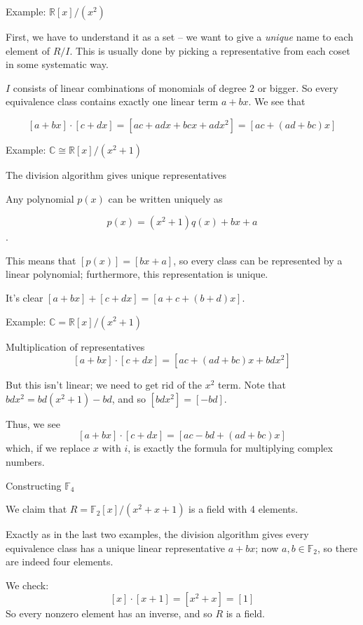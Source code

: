 \documentclass{beamer}
\newcommand{\C}{\mathbb{C}}
\newcommand{\R}{\mathbb{R}}
\begin{document}
\begin{frame}{Example: $\R[x]/(x^2)$}

First, we have to understand it as a set -- we want to give a \emph{unique} name to each element of $R/I$.  This is usually done by picking a representative from each coset in some systematic way.

$I$ consists of linear combinations of monomials of degree 2 or bigger.  So every equivalence class contains exactly one linear term $a+bx$.  We see that 

$$[a+bx]\cdot [c+dx]=[ac+adx+bcx+adx^2]=[ac+(ad+bc)x]$$


\end{frame}


\begin{frame}{Example: $\C\cong\R[x]/(x^2+1)$}

\begin{block}{The division algorithm gives unique representatives}

Any polynomial $p(x)$ can be written uniquely as

 $$p(x)=(x^2+1)q(x)+bx+a$$. 

This means that $[p(x)]=[bx+a]$, so every class can be represented by a linear polynomial; furthermore, this representation is unique.
\end{block}

It's clear $[a+bx]+[c+dx]=[a+c+(b+d)x]$.
\end{frame}

\begin{frame}{Example: $\mathbb{C}=\R[x]/(x^2+1)$}

\begin{block}{Multiplication of representatives}
$$[a+bx]\cdot [c+dx]=[ac+(ad+bc)x+bdx^2]$$

But this isn't linear;  we need to get rid of the $x^2$ term.  Note that $bdx^2=bd(x^2+1)-bd$, and so $[bdx^2]=[-bd]$.

Thus, we see
$$[a+bx]\cdot [c+dx]=[ac-bd+(ad+bc)x]$$
which, if we replace $x$ with $i$, is exactly the formula for multiplying complex numbers.
\end{block}


\end{frame}

\begin{frame}{Constructing $\mathbb{F}_4$}

We claim that $R=\mathbb{F}_2[x]/(x^2+x+1)$ is a field with 4 elements.  

Exactly as in the last two examples, the division algorithm gives every equivalence class has a unique linear representative $a+bx$; now $a,b\in\mathbb{F}_2$, so there are indeed four elements.

We check:
$$[x]\cdot [x+1]=[x^2+x]=[1]$$
So every nonzero element has an inverse, and so $R$ is a field.
\end{frame}
\end{document}

